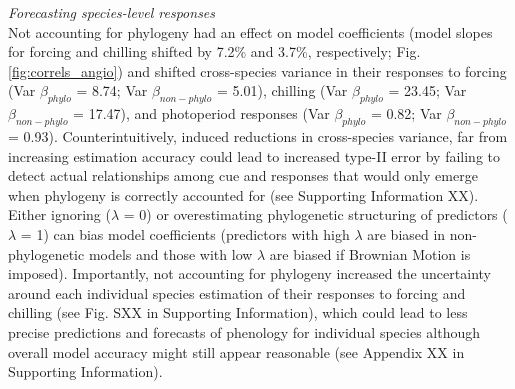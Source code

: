 \documentclass{article}\usepackage[]{graphicx}\usepackage[]{color}
\begin{document}
\emph{Forecasting species-level responses}\\
Not accounting for phylogeny had an effect on model coefficients (model slopes for forcing and chilling shifted by 7.2\% and 3.7\%, respectively; Fig. \ref{fig:correls_angio}) and shifted cross-species variance in their responses to forcing (Var $\beta_{phylo}$ = 8.74; Var $\beta_{non-phylo}$ = 5.01), chilling (Var $\beta_{phylo}$ = 23.45; Var $\beta_{non-phylo}$ = 17.47), and photoperiod responses (Var $\beta_{phylo}$ = 0.82; Var $\beta_{non-phylo}$ = 0.93). Counterintuitively, induced reductions in cross-species variance, far from increasing estimation accuracy could lead to increased type-II error by failing to detect actual relationships among cue and responses that would only emerge when phylogeny is correctly accounted for (see Supporting Information XX). Either ignoring ($\lambda$ = 0) or overestimating phylogenetic structuring of predictors ($\lambda$ = 1) can bias model coefficients (predictors with high $\lambda$ are biased in non-phylogenetic models and those with low $\lambda$ are biased if Brownian Motion is imposed). Importantly, not accounting for phylogeny increased the uncertainty around each individual species estimation of their responses to forcing and chilling (see Fig. SXX in Supporting Information), which could lead to less precise predictions and forecasts of phenology for individual species although overall model accuracy might still appear reasonable (see Appendix XX in Supporting Information).\\

\end{document}
